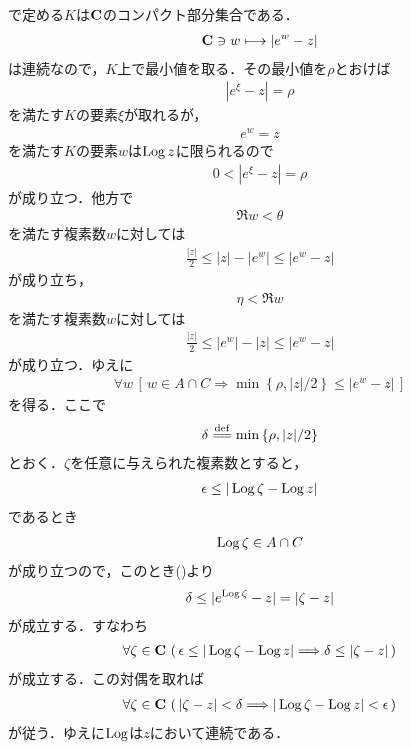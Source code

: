 \begin{sketch}
\begin{description}
				で定める$K$は$\mathbf{C}$のコンパクト部分集合である．
				\begin{align}
					\mathbf{C} \ni w \longmapsto |e^{w} - z|
				\end{align}
				は連続なので，$K$上で最小値を取る．その最小値を$\rho$とおけば
				\begin{align}
					|e^{\xi} - z| = \rho
				\end{align}
				を満たす$K$の要素$\xi$が取れるが，
				\begin{align}
					e^{w} = z
				\end{align}
				を満たす$K$の要素$w$は$\operatorname{Log}{z}$に限られるので
				\begin{align}
					0 < |e^{\xi} - z| = \rho
				\end{align}
				が成り立つ．他方で
				\begin{align}
					\Re{w} < \theta
				\end{align}
				を満たす複素数$w$に対しては
				\begin{align}
					\frac{|z|}{2} \leq |z| - |e^{w}| \leq |e^{w} - z|
				\end{align}
				が成り立ち，
				\begin{align}
					\eta < \Re{w}
				\end{align}
				を満たす複素数$w$に対しては
				\begin{align}
					\frac{|z|}{2} \leq |e^{w}| - |z| \leq |e^{w} - z|
				\end{align}
				が成り立つ．ゆえに
				\begin{align}
					\forall w\,
					\left[\, w \in A \cap C \Longrightarrow 
					\min\left\{\rho,|z|/2\right\} \leq |e^{w} - z|\, \right]
					\label{fom:thm_pv_log_is_holomorphic}
				\end{align}
				を得る．ここで
				\begin{align}
					\delta \defeq \min\left\{\rho,|z|/2\right\}
				\end{align}
				とおく．$\zeta$を任意に与えられた複素数とすると，
				\begin{align}
					\epsilon \leq |\operatorname{Log}{\zeta} - \operatorname{Log}{z}|
				\end{align}
				であるとき
				\begin{align}
					\operatorname{Log}{\zeta} \in A \cap C
				\end{align}
				が成り立つので，このとき()より
				\begin{align}
					\delta \leq |e^{\operatorname{Log}{\zeta}} - z| = |\zeta - z|
				\end{align}
				が成立する．すなわち
				\begin{align}
					\forall \zeta \in \mathbf{C}\, \left(\,
					\epsilon \leq |\operatorname{Log}{\zeta} - \operatorname{Log}{z}| 
					\Longrightarrow \delta \leq |\zeta - z|\, \right)
				\end{align}
				が成立する．この対偶を取れば
				\begin{align}
					\forall \zeta \in \mathbf{C}\, \left(\,
					|\zeta - z| < \delta \Longrightarrow |\operatorname{Log}{\zeta} - \operatorname{Log}{z}| < \epsilon\, \right)
				\end{align}
				が従う．ゆえに$\operatorname{Log}$は$z$において連続である．
				

\end{description}
\end{sketch}
